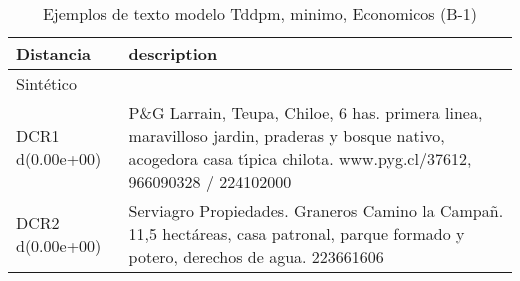 \begin{table}[H]
\centering
\fontsize{10}{14}\selectfont
\caption{Ejemplos de texto modelo Tddpm, minimo, Economicos (B-1)}
\label{table-example-economicos-b-1-tddpm_mlp-min-text}
\begin{tabular}{|l|m{35em}|}
\hline
\rowcolor[gray]{0.8}
Distancia & description \\
\hline Sintético &  \\
\hline DCR1 d(0.00e+00) & P\&G Larrain, Teupa, Chiloe, 6 has. primera linea, maravilloso jardin, praderas y bosque nativo, acogedora casa t{\'\i}pica chilota. www.pyg.cl/37612, 966090328 / 224102000 \\
\hline DCR2 d(0.00e+00) & Serviagro Propiedades. Graneros Camino la Campa\~n. 11,5 hect\'areas, casa patronal, parque formado y potero, derechos de agua. 223661606 \\
\hline
\end{tabular}
\end{table}
